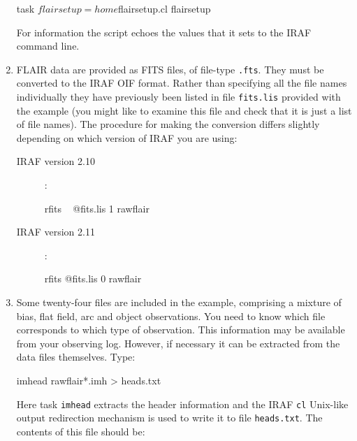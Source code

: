 \documentclass[chapters,twoside,11pt]{starlink}
\begin{document}
\begin{enumerate}
\begin{terminalv}
task  $flairsetup=home$flairsetup.cl
flairsetup
\end{terminalv}

   For information the script echoes the values that it sets
   to the IRAF command line.

  \item FLAIR data are provided as FITS files, of file-type \texttt{.fts}.  They must be converted to the IRAF OIF format.
   Rather than specifying all the file names individually they
   have previously been listed in file \texttt{fits.lis} provided
   with the example (you might like to examine this file and
   check that it is just a list of file names).  The procedure
   for making the conversion differs slightly depending on
   which version of IRAF you are using:

  \begin{description}

    \item[IRAF version 2.10]: ~

\begin{terminalv}
rfits ~ @fits.lis  1  rawflair
\end{terminalv}

    \item[IRAF version 2.11]: ~

\begin{terminalv}
rfits  @fits.lis  0  rawflair
\end{terminalv}

  \end{description}

  \item Some twenty-four files are included in the example,
   comprising a mixture of bias, flat field, arc and object observations.
   You need to know which file corresponds to which type of
   observation.  This information may be available from your
   observing log.  However, if necessary it can be extracted
   from the data files themselves.  Type:

\begin{terminalv}
imhead  rawflair*.imh  >  heads.txt
\end{terminalv}

   Here task \texttt{imhead} extracts the header information and the IRAF \texttt{cl} Unix-like output redirection mechanism is used to write it to file
   \texttt{heads.txt}.  The contents of this file should be:


\end{enumerate}
\end{document}
